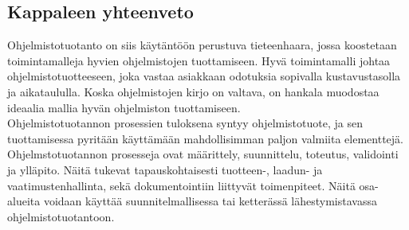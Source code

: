 \documentclass[finnish,12pt,a4paper,pdftex]{article}
\begin{document}



\subsection{Kappaleen yhteenveto}

Ohjelmistotuotanto on siis käytäntöön perustuva tieteenhaara, jossa koostetaan toimintamalleja hyvien ohjelmistojen tuottamiseen. Hyvä toimintamalli johtaa ohjelmistotuotteeseen, joka vastaa asiakkaan odotuksia sopivalla kustavustasolla ja aikataululla. Koska ohjelmistojen kirjo on valtava, on hankala muodostaa ideaalia mallia hyvän ohjelmiston tuottamiseen.\\

Ohjelmistotuotannon prosessien tuloksena syntyy ohjelmistotuote, ja sen tuottamisessa pyritään käyttämään mahdollisimman paljon valmiita elementtejä. Ohjelmstotuotannon prosesseja ovat määrittely, suunnittelu, toteutus, validointi ja ylläpito. Näitä tukevat tapauskohtaisesti tuotteen-, laadun- ja vaatimustenhallinta, sekä dokumentointiin liittyvät toimenpiteet. Näitä osa-alueita voidaan käyttää suunnitelmallisessa tai ketterässä lähestymistavassa ohjelmistotuotantoon.\\
\end{document}
